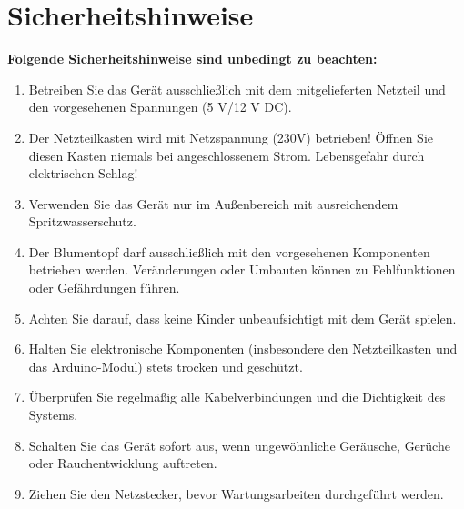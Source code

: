 %
%
%

\chapter{Sicherheitshinweise}
\textbf{Folgende Sicherheitshinweise sind unbedingt zu beachten:}\\
\begin{enumerate}
	\item Betreiben Sie das Gerät ausschließlich mit dem mitgelieferten Netzteil und den vorgesehenen Spannungen (5 V/12 V DC).
	\item Der Netzteilkasten wird mit Netzspannung (230V) betrieben! Öffnen Sie diesen Kasten niemals bei angeschlossenem Strom. Lebensgefahr durch elektrischen Schlag!
	\item Verwenden Sie das Gerät nur im Außenbereich mit ausreichendem Spritzwasserschutz.
	\item Der Blumentopf darf ausschließlich mit den vorgesehenen Komponenten betrieben werden. Veränderungen oder Umbauten können zu Fehlfunktionen oder Gefährdungen führen.
	\item Achten Sie darauf, dass keine Kinder unbeaufsichtigt mit dem Gerät spielen.
	\item Halten Sie elektronische Komponenten (insbesondere den Netzteilkasten und das Arduino-Modul) stets trocken und geschützt.
	\item Überprüfen Sie regelmäßig alle Kabelverbindungen und die Dichtigkeit des Systems.
	\item Schalten Sie das Gerät sofort aus, wenn ungewöhnliche Geräusche, Gerüche oder Rauchentwicklung auftreten.
	\item Ziehen Sie den Netzstecker, bevor Wartungsarbeiten durchgeführt werden.
\end{enumerate}





